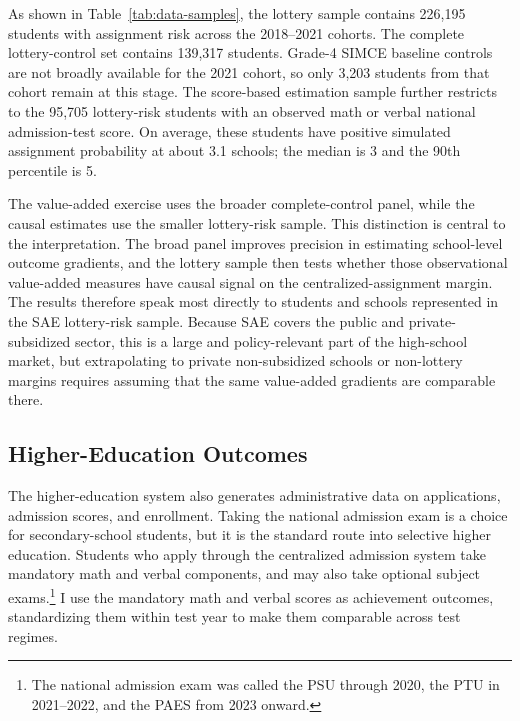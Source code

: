 \documentclass[a4paper, article, english, oneside, unknownkeysallowed, 12pt]{memoir}
\begin{document}
As shown in Table~\ref{tab:data-samples}, the lottery sample contains 226,195 students with assignment risk across the 2018--2021 cohorts.
The complete lottery-control set contains 139,317 students. Grade-4 SIMCE baseline controls are not broadly available for the 2021 cohort, so only 3,203 students from that cohort remain at this stage.
The score-based estimation sample further restricts to the 95,705 lottery-risk students with an observed math or verbal national admission-test score.
On average, these students have positive simulated assignment probability at about 3.1 schools; the median is 3 and the 90th percentile is 5.


The value-added exercise uses the broader complete-control panel, while the causal estimates use the smaller lottery-risk sample.
This distinction is central to the interpretation.
The broad panel improves precision in estimating school-level outcome gradients, and the lottery sample then tests whether those observational value-added measures have causal signal on the centralized-assignment margin.
The results therefore speak most directly to students and schools represented in the SAE lottery-risk sample.
Because SAE covers the public and private-subsidized sector, this is a large and policy-relevant part of the high-school market, but extrapolating to private non-subsidized schools or non-lottery margins requires assuming that the same value-added gradients are comparable there.

\subsection{Higher-Education Outcomes}

The higher-education system also generates administrative data on applications, admission scores, and enrollment.
Taking the national admission exam is a choice for secondary-school students, but it is the standard route into selective higher education.
Students who apply through the centralized admission system take mandatory math and verbal components, and may also take optional subject exams.\footnote{The national admission exam was called the PSU through 2020, the PTU in 2021--2022, and the PAES from 2023 onward.}
I use the mandatory math and verbal scores as achievement outcomes, standardizing them within test year to make them comparable across test regimes.
\end{document}
